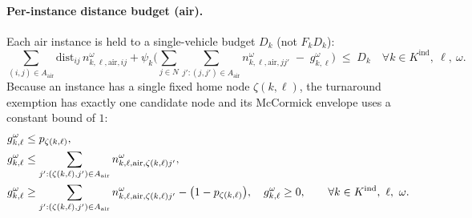 \paragraph{Per-instance distance budget (air).}
Each air instance is held to a single-vehicle budget $D_k$ (not $F_k D_k$):
\begin{equation}
\sum_{(i,j)\in A_{\text{air}}} \text{dist}_{ij}\, n^\omega_{k,\ell,\text{air},ij}
+ \psi_k \Bigg( \sum_{j \in N} \sum_{j':(j,j')\in A_{\text{air}}}
      n^\omega_{k,\ell,\text{air},jj'}
  \;-\; g^\omega_{k,\ell} \Bigg)
\;\leq\; D_k
\quad \forall k \in K^{\mathrm{ind}},\ \ell,\ \omega.
\label{eq:vif:indvehdistbudget}
\end{equation}
Because an instance has a single fixed home node $\zeta(k,\ell)$, the
turnaround exemption has exactly one candidate node and its McCormick envelope
uses a constant bound of $1$:
\begin{align}
g^\omega_{k,\ell} &\leq p_{\zeta(k,\ell)}, \label{eq:vif:mccormickind} \\
g^\omega_{k,\ell} &\leq \sum_{j':(\zeta(k,\ell),j')\in A_{\text{air}}}
      n^\omega_{k,\ell,\text{air},\zeta(k,\ell)j'}, \notag \\
g^\omega_{k,\ell} &\geq \sum_{j':(\zeta(k,\ell),j')\in A_{\text{air}}}
      n^\omega_{k,\ell,\text{air},\zeta(k,\ell)j'} - \bigl(1 - p_{\zeta(k,\ell)}\bigr),
  \quad g^\omega_{k,\ell} \geq 0,
  \qquad \forall k \in K^{\mathrm{ind}},\ \ell,\ \omega. \notag
\end{align}

